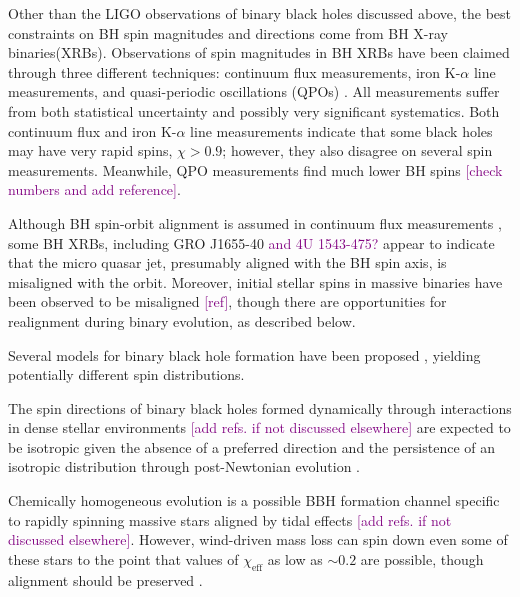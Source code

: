 \documentclass[modern]{aastex61}
\newcommand{\ilya}[1]{\textcolor{purple}{#1}}
\begin{document}
Other than the LIGO observations of binary black holes discussed above, the best constraints on BH spin magnitudes and directions come from BH X-ray binaries(XRBs). Observations of spin magnitudes in BH XRBs have been claimed through three different techniques: continuum flux measurements, iron K-$\alpha$ line measurements, and quasi-periodic oscillations (QPOs) \citep[e.g.,][for a review]{MillerMiller:2015}. All measurements suffer from both statistical uncertainty and possibly very significant systematics.  Both continuum flux and iron K-$\alpha$ line measurements indicate that some black holes may have very rapid spins, $\chi>0.9$; however, they also disagree on several spin measurements.  Meanwhile, QPO measurements find much lower BH spins \ilya{[check numbers and add reference]}.

Although BH spin-orbit alignment is assumed in continuum flux measurements \citep{MillerMiller:2015}, some BH XRBs, including GRO J1655-40 \ilya{and 4U 1543-475?} appear to indicate that the micro quasar jet, presumably aligned with the BH spin axis, is misaligned with the orbit.  Moreover, initial stellar spins in massive binaries have been observed to be misaligned \ilya{[ref]}, though there are opportunities for realignment during binary evolution, as described below.

Several models for binary black hole formation have been proposed \citep[e.g.,][]{GW150914:astro}, yielding potentially different spin distributions.

The spin directions of binary black holes formed dynamically through interactions in dense stellar environments \ilya{[add refs. if not discussed elsewhere]} are expected to be isotropic given the absence of a preferred direction \citep[e.g.,][]{Rodriguez:2016spins} and the persistence of an isotropic distribution through post-Newtonian evolution \citep{Schnittman:2004}. 

Chemically homogeneous evolution is a possible BBH formation channel specific to rapidly spinning massive stars aligned by tidal effects \ilya{[add refs. if not discussed elsewhere]}.  However, wind-driven mass loss can spin down even some of these stars to the point that values of $\chi_\textrm{eff}$ as low as $\sim 0.2$ are possible, though alignment should be preserved \citep{Marchant:2017}.
\end{document}
